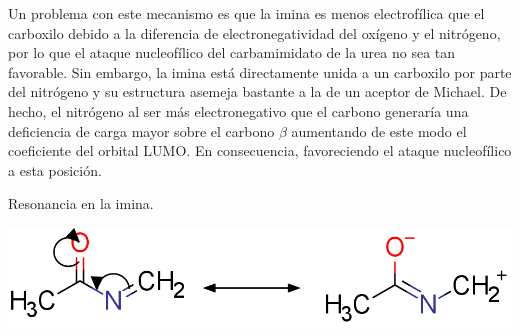 \documentclass[fleqn,10pt]{SelfArx}
\begin{document}
Un problema con este mecanismo es que la imina es menos electrofílica que el carboxilo debido a la diferencia de electronegatividad del oxígeno y el nitrógeno, por lo que el ataque nucleofílico del carbamimidato de la urea no sea tan favorable. Sin embargo, la imina está directamente unida a un carboxilo por parte del nitrógeno y su estructura asemeja bastante a la de un aceptor de Michael. De hecho, el nitrógeno al ser más electronegativo que el carbono generaría una deficiencia de carga mayor sobre el carbono $\beta$ aumentando de este modo el coeficiente del orbital LUMO. En consecuencia, favoreciendo el ataque nucleofílico a esta posición.
\begin{scheme}[h]
	\centering
	\caption{Resonancia en la imina.}
	\includegraphics[width=0.6\linewidth]{structures/resonancia.png}
\end{scheme}
\end{document}
